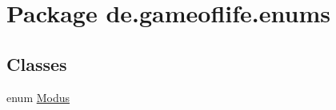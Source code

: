 \hypertarget{namespacede_1_1gameoflife_1_1enums}{\section{Package de.\-gameoflife.\-enums}
\label{namespacede_1_1gameoflife_1_1enums}
}
\subsection*{Classes}
\begin{DoxyCompactItemize}
\item 
enum \hyperlink{enumde_1_1gameoflife_1_1enums_1_1Modus}{Modus}
\end{DoxyCompactItemize}
